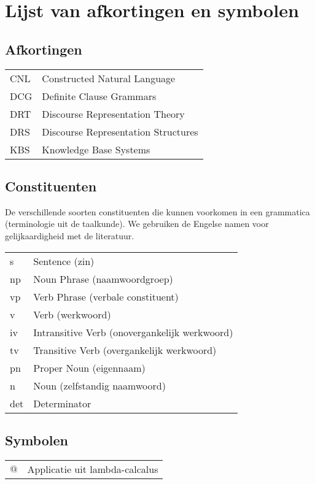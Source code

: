 \chapter{Lijst van afkortingen en symbolen}
\section*{Afkortingen}
\begin{flushleft}
  \renewcommand{\arraystretch}{1.1}
  \begin{tabularx}{\textwidth}{@{}p{12mm}X@{}}
    CNL   & Constructed Natural Language \\
    DCG   & Definite Clause Grammars \\
    DRT   & Discourse Representation Theory \\
    DRS   & Discourse Representation Structures \\
    KBS   & Knowledge Base Systems \\
  \end{tabularx}
\end{flushleft}
\section*{Constituenten}
De verschillende soorten constituenten die kunnen voorkomen in een grammatica (terminologie uit de taalkunde). We gebruiken de Engelse namen voor gelijkaardigheid met de literatuur.
\begin{flushleft}
  \renewcommand{\arraystretch}{1.1}
  \begin{tabularx}{\textwidth}{@{}p{12mm}X@{}}
    s     & Sentence (zin) \\
    np    & Noun Phrase (naamwoordgroep) \\
    vp    & Verb Phrase (verbale constituent) \\
    v     & Verb (werkwoord) \\
    iv    & Intransitive Verb (onovergankelijk werkwoord) \\
    tv    & Transitive Verb (overgankelijk werkwoord) \\
    pn    & Proper Noun (eigennaam) \\
    n     & Noun (zelfstandig naamwoord) \\
    det   & Determinator \\
  \end{tabularx}
\end{flushleft}

\section*{Symbolen}
\begin{flushleft}
  \renewcommand{\arraystretch}{1.1}
  \begin{tabularx}{\textwidth}{@{}p{12mm}X@{}}
    $@$   & Applicatie uit lambda-calcalus \\
  \end{tabularx}
\end{flushleft}
